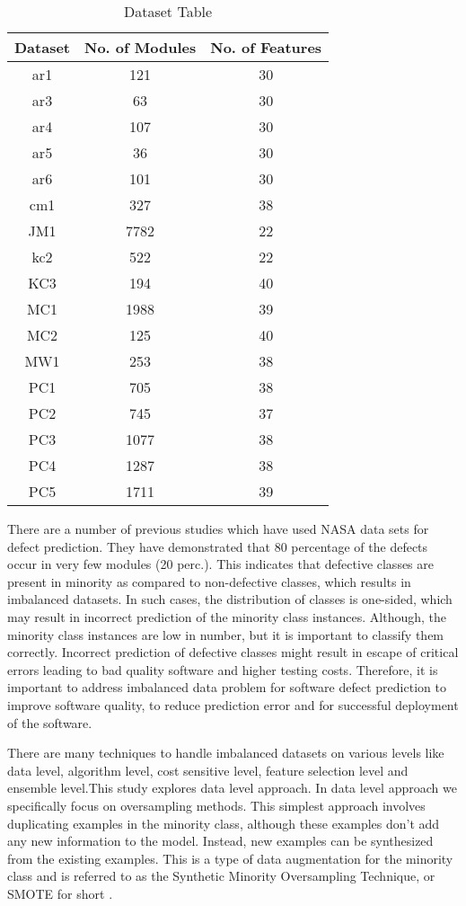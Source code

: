\begin{table}[ht]
    \centering
    \begin{tabular}{|c|c|c|}
    \hline
    Dataset & No. of Modules & No. of Features\\
    \hline
    \hline
    ar1  & 121  & 30  \\
 \hline
 ar3  & 63  & 30  \\
 \hline
 ar4  & 107  & 30  \\
 \hline
 ar5  & 36  & 30  \\
 \hline
 ar6  & 101  & 30  \\
\hline
 cm1 & 327 & 38  \\
\hline
 JM1 & 7782 & 22\\
\hline
 kc2 & 522 & 22\\
\hline
 KC3 & 194 & 40\\
\hline
 MC1 & 1988 & 39\\
\hline
 MC2 & 125 & 40\\
\hline
 MW1 & 253 & 38\\
\hline
 PC1 & 705 & 38\\
\hline
 PC2 & 745 & 37\\
\hline
 PC3 & 1077 & 38\\
\hline
 PC4 & 1287 & 38\\
\hline
 PC5 & 1711 & 39\\
\hline
    \end{tabular}
    \caption{Dataset Table}
\end{table}

There are a number of previous studies which have used NASA data sets for defect prediction. They have demonstrated that 80 percentage of the defects occur in very few modules (20 perc.). This indicates that defective classes are present in minority as compared to non-defective classes, which results in imbalanced datasets. In such cases, the distribution of classes is one-sided, which may result in incorrect prediction of the minority class instances. Although, the minority class instances are low in number, but it is important to classify them correctly. Incorrect prediction of defective classes might result in escape of critical errors leading to bad quality software and higher testing costs. Therefore, it is important to address imbalanced data problem for software defect prediction to improve software quality, to reduce prediction error and for successful deployment of the software.

There are many techniques to handle imbalanced datasets on various levels like data level, algorithm level, cost sensitive level, feature selection level and ensemble level.This study explores data level approach. In data level approach we specifically focus on oversampling methods. 
\newline
This simplest approach involves duplicating examples in the minority class, although these examples don’t add any new information to the model. Instead, new examples can be synthesized from the existing examples. This is a type of data augmentation for the minority class and is referred to as the Synthetic Minority Oversampling Technique, or SMOTE for short .\cite{malhotra2019empirical}

